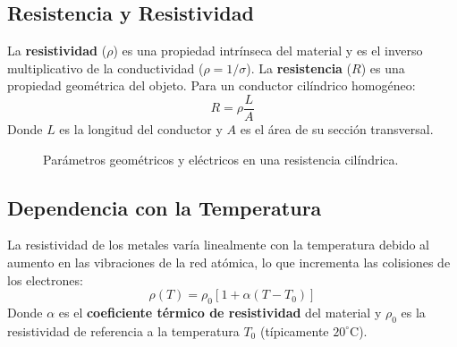 \documentclass[12pt, a4paper]{article}
\begin{document}
\subsection{Resistencia y Resistividad}
La \textbf{resistividad} ($\rho$) es una propiedad intrínseca del material y es el inverso multiplicativo de la conductividad ($\rho = 1/\sigma$). La \textbf{resistencia} ($R$) es una propiedad geométrica del objeto. Para un conductor cilíndrico homogéneo:
\begin{equation}
    R = \rho \frac{L}{A}
\end{equation}
Donde $L$ es la longitud del conductor y $A$ es el área de su sección transversal.

\begin{figure}[htbp]
  \centering
  \shorthandoff{<>}
  \shorthandon{<>}
  \caption{Parámetros geométricos y eléctricos en una resistencia cilíndrica.}
  \label{fig:resistencia}
\end{figure}

\subsection{Dependencia con la Temperatura}
La resistividad de los metales varía linealmente con la temperatura debido al aumento en las vibraciones de la red atómica, lo que incrementa las colisiones de los electrones:
\begin{equation}
    \rho(T) = \rho_0 [1 + \alpha (T - T_0)]
\end{equation}
Donde $\alpha$ es el \textbf{coeficiente térmico de resistividad} del material y $\rho_0$ es la resistividad de referencia a la temperatura $T_0$ (típicamente $20^\circ\text{C}$).
\end{document}
